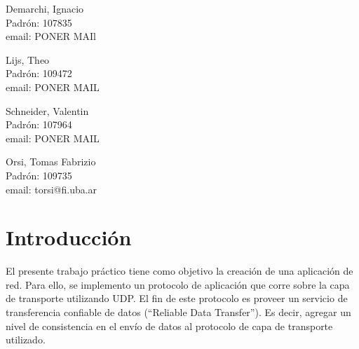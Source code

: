 \documentclass{article}
\begin{document}
\begin{titlepage}
\begin{center}
    {\begin{minipage}{.5\textwidth}
        \begin{center}
          Demarchi, Ignacio\\
          {\small{Padrón: 107835}}\\
          {\small{email: PONER MAIl}}\\
        \end{center}
      \end{minipage}\begin{minipage}{.5\textwidth}
        \begin{center}
          Lijs, Theo\\
          {\small{Padrón: 109472}}\\
          {\small{email: PONER MAIL}}
        \end{center}
      \end{minipage}}

    \vspace{1.0cm}

    {\begin{minipage}{.5\textwidth}
        \begin{center}
          Schneider, Valentin\\
          {\small{Padrón: 107964}}\\
          {\small{email: PONER MAIL}}\\
        \end{center}
      \end{minipage}\begin{minipage}{.5\textwidth}
        \begin{center}
          Orsi, Tomas Fabrizio\\
          {\small{Padrón: 109735}}\\
          {\small{email: torsi@fi.uba.ar}}
        \end{center}
      \end{minipage}}

  \end{center}
\end{titlepage}

\tableofcontents
\pagebreak

\section{\texorpdfstring{\textbf{Introducción}}{Introducción}}\label{introducciuxf3n}

El presente trabajo práctico tiene como objetivo la creación de una
aplicación de red. Para ello, se implemento un protocolo de aplicación
que corre sobre la capa de transporte utilizando UDP. El fin de este
protocolo es proveer un servicio de transferencia confiable de datos
(``Reliable Data Transfer''). Es decir, agregar un nivel de consistencia
en el envío de datos al protocolo de capa de transporte utilizado.
\end{document}
